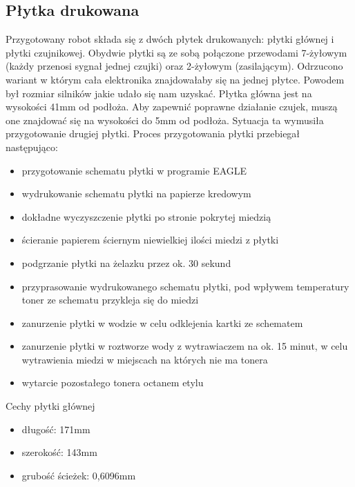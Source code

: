\documentclass[11pt,a4paper]{article}
\begin{document}
\subsection{Płytka drukowana} 
Przygotowany robot składa się z dwóch płytek drukowanych: płytki głównej i płytki czujnikowej. 
Obydwie płytki są ze sobą połączone przewodami 7-żyłowym (każdy przenosi sygnał jednej czujki) oraz 2-żyłowym (zasilającym).
Odrzucono wariant w którym cała elektronika znajdowałaby się na jednej płytce. Powodem był rozmiar silników jakie udało się nam uzyskać. 
Płytka główna jest na wysokości 41mm od podłoża. Aby zapewnić poprawne działanie czujek, muszą one znajdować się na wysokości do 5mm od podłoża. 
Sytuacja ta wymusiła przygotowanie drugiej płytki. Proces przygotowania płytki przebiegał następująco:
  \begin {itemize}
    \item przygotowanie schematu płytki w programie EAGLE
    \item wydrukowanie schematu płytki na papierze kredowym
    \item dokładne wyczyszczenie płytki po stronie pokrytej miedzią
    \item ścieranie papierem ściernym niewielkiej ilości miedzi z płytki
    \item podgrzanie płytki na żelazku przez ok. 30 sekund
    \item przyprasowanie wydrukowanego schematu płytki, pod wpływem temperatury toner ze schematu przykleja się do miedzi
    \item zanurzenie płytki w wodzie w celu odklejenia kartki ze schematem
    \item zanurzenie płytki w roztworze wody z wytrawiaczem na ok. 15 minut, w celu wytrawienia miedzi w miejscach na których nie ma tonera
    \item wytarcie pozostałego tonera octanem etylu
  \end{itemize}
Cechy płytki głównej
  \begin{itemize}
    \item długość: 171mm
    \item szerokość: 143mm
    \item grubość ścieżek: 0,6096mm
  \end{itemize}
  
\end{document}

